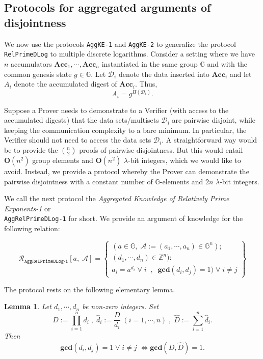 \documentclass[11pt, lettersize, notitlepage, leqno, footskip=0.6cm]{article}
\newcommand{\bz}{\mathbb Z}
\newcommand{\pl}{\prod\limits}
\newcommand{\slim}{\sum\limits}
\newcommand{\ttt}{\texttt}
\newcommand{\Acc}{\mbf{Acc}}
\newcommand{\LRA}{\Longleftrightarrow}
\newcommand{\mc}{\mathcal}
\newcommand{\mb}{\mathbb}
\newcommand{\mbf}{\mathbf}
\newcommand{\lam}{\lambda}
\newcommand{\what}{\widehat}
\newcommand{\vs}{\vspace{-0.15cm}}
\newcommand{\noin}{\noindent}
\newcommand{\GCD}{\mbf{gcd}}
\newtheorem{Lem}[Thm]{Lemma}
\numberwithin{equation}{section}
\begin{document}
\subsection{\fontsize{11}{11}\selectfont Protocols for aggregated arguments of disjointness}

We now use the protocols \verb|AggKE-1| and \verb|AggKE-2| to generalize the protocol \verb|RelPrimeDLog| to multiple discrete logarithms. Consider a setting where we have $n$ accumulators $\Acc_1,\cdots,\Acc_n$ instantiated in the same group $\mb{G}$ and with the common genesis state $g\in\mb{G}$. Let $\mc{D}_i$ denote the data inserted into $\Acc_i$ and let $A_i$ denote the accumulated digest of $\Acc_i$. Thus, \vs $$A_i = g^{\Pi(\mc{D}_i)} .$$ 

Suppose a Prover needs to demonstrate to a Verifier (with access to the accumulated digests) that the data sets/multisets $\mc{D}_i$ are pairwise disjoint, while keeping the communication complexity to a bare minimum. In particular, the Verifier should not need to access the data sets $\mc{D}_i$. A straightforward way would be to provide the $n\choose 2$ proofs of pairwise disjointness. But this would entail $\mbf{O}(n^2)$ group elements and $\mbf{O}(n^2)$ $\lam$-bit integers, which we would like to avoid. Instead, we provide a protocol whereby the Prover can demonstrate the pairwise disjointness with a constant number of $\mb{G}$-elements and $2n$ $\lam$-bit integers.

We call the next protocol the \textit{Aggregated Knowledge of Relatively Prime Exponents-1} or\\ \verb|AggRelPrimeDLog-1| for short. We provide an argument of knowledge for the following relation:

\[
  \mc{R}_{\ttt{AggRelPrimeDLog-1}}[a,\; \mc{A}] = \left\{\begin{array}{l}
    (a\in\mb{G},\;  \mc{A}:=(a_1,\cdots, a_n)\in\mb{G}^n);\\
    (d_1,\cdots,d_n)\in\bz^n): \\
    a_i = a^{d_i}\;\forall\;i\;\;,\;\; \GCD(d_i, d_j) = 1)\;\forall \;i\neq j   	
  \end{array}\right\}
\] 

\noin The protocol rests on the following elementary lemma.

\begin{Lem}\label{lcm} Let $d_1,\cdots,d_n$ be non-zero integers. Set \vs $$D:= \pl_{i=1}^n d_i\;,\; \what{d}_i:= \frac{D}{d_i}\;(i=1,\cdots,n) \;,\;\what{D}:= \slim_{i=1}^n \what{d}_i.$$ Then \vs $$\GCD(d_i,d_j)=1\;\forall\;i\neq j\; \LRA \GCD(D, \what{D}) = 1 .$$\end{Lem}
\end{document}
